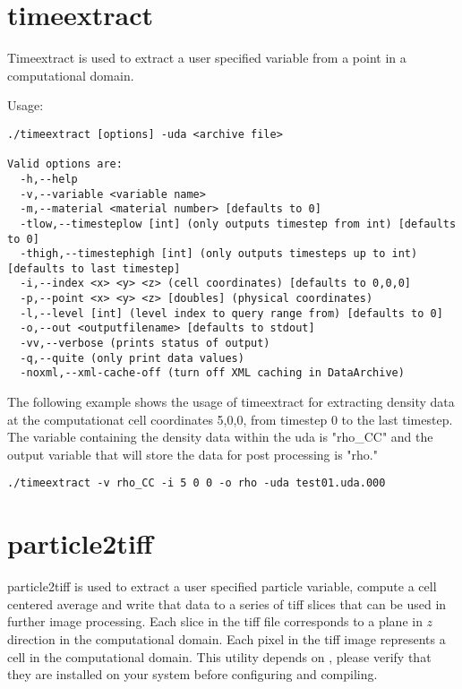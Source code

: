 \section{timeextract}

Timeextract is used to extract a user specified variable from a point in a computational
domain.

Usage: \begin{Verbatim}[fontsize=\footnotesize]
./timeextract [options] -uda <archive file>

Valid options are:
  -h,--help
  -v,--variable <variable name>
  -m,--material <material number> [defaults to 0]
  -tlow,--timesteplow [int] (only outputs timestep from int) [defaults to 0]
  -thigh,--timestephigh [int] (only outputs timesteps up to int) [defaults to last timestep]
  -i,--index <x> <y> <z> (cell coordinates) [defaults to 0,0,0]
  -p,--point <x> <y> <z> [doubles] (physical coordinates)
  -l,--level [int] (level index to query range from) [defaults to 0]
  -o,--out <outputfilename> [defaults to stdout]
  -vv,--verbose (prints status of output)
  -q,--quite (only print data values)
  -noxml,--xml-cache-off (turn off XML caching in DataArchive)
 \end{Verbatim}

The following example shows the usage of timeextract for extracting density data
at the computationat cell coordinates 5,0,0, from timestep 0 to the last
timestep. The variable containing the density data within the uda is "rho\_CC" and the output variable that
will store the data for post processing is "rho."
\begin{Verbatim}[fontsize=\footnotesize]
./timeextract -v rho_CC -i 5 0 0 -o rho -uda test01.uda.000
\end{Verbatim}

\section{particle2tiff}
particle2tiff is used to extract a user specified particle variable,
compute a cell centered average and write that data to a series of tiff
slices that can be used in further image processing.  Each slice in the tiff
file corresponds to a plane in $z$ direction in the computational domain.
Each pixel in the tiff image represents a cell in the computational domain.
This utility depends on , please
verify that they are installed on your system before configuring and compiling.



